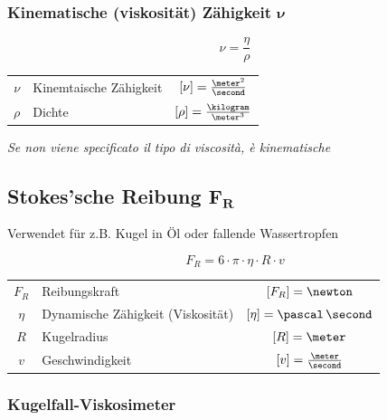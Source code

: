 \subsubsection{Kinematische (viskosität) Zähigkeit $\bm{\nu}$}

\begin{minipage}[c]{0.3\columnwidth}
    \[\boxed{ \nu = \frac{\eta}{\rho} } \]
\end{minipage}
\hfill
\begin{minipage}[c]{0.68\columnwidth}
    \renewcommand{\arraystretch}{1.5}
    \begin{tabular}{c l c}
        $\nu$   & Kinemtaische Zähigkeit    & $[\nu] = \frac{\meter^2}{\second}$    \\
        $\rho$  & Dichte                    & $[\rho] = \frac{\kilogram}{\meter^3}$ \\	
    \end{tabular}
    \renewcommand{\arraystretch}{1.5}
\end{minipage}\vspace{1em}

\textit{Se non viene specificato il tipo di viscosità, è kinematische}

\subsection[Stokes'sche Reibung]{Stokes'sche Reibung $\bm{F_R}$}

Verwendet für z.B. Kugel in Öl oder fallende Wassertropfen

\[\boxed{ F_R = 6 \cdot \pi \cdot \eta \cdot R \cdot v } \]

\begin{tabular}{c l c}
    $F_R$   & Reibungskraft                     & $[F_R] = \newton$                         \\
    $\eta$  & Dynamische Zähigkeit (Viskosität) & $[\eta] = \mathrm{\pascal \, \second}$    \\
    $R$     & Kugelradius                       & $[R] = \meter$                            \\
    $v$     & Geschwindigkeit                   & $[v] = \frac{\meter}{\second}$		
\end{tabular}


\subsubsection{Kugelfall-Viskosimeter}

